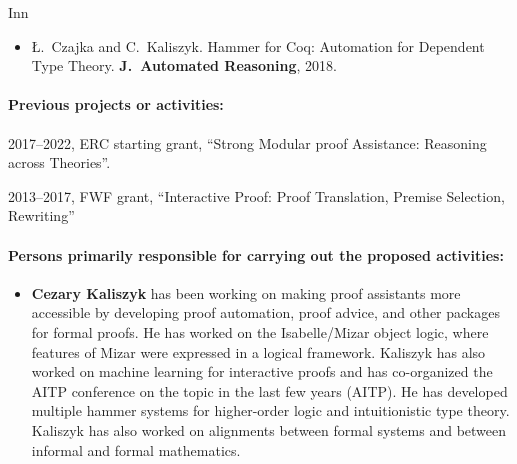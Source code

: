 \begin{sitedescription}{Inn}
\begin{itemize}
\item
Ł.~Czajka and C.~Kaliszyk.
\newblock Hammer for Coq: Automation for Dependent Type Theory.
\textbf{J.~Automated Reasoning}, 2018.
\end{itemize}

\paragraph{Previous projects or activities:}

\begin{compactitem}
\item 2017--2022, ERC starting grant, ``Strong Modular proof Assistance: Reasoning across Theories''.
\item 2013--2017, FWF grant, ``Interactive Proof: Proof Translation, Premise Selection, Rewriting''
\end{compactitem}




\paragraph{Persons primarily responsible for carrying out the proposed activities:}

\begin{itemize}
\item \textbf{Cezary Kaliszyk} has been working on making proof assistants
more accessible by developing proof automation, proof advice, and other packages for formal
proofs. He has worked on the Isabelle/Mizar object logic, where features of Mizar were
expressed in a logical framework. Kaliszyk has also worked on machine learning for interactive
proofs and has co-organized the AITP conference on the topic in the last few years (AITP). He
has developed multiple hammer systems for higher-order logic and intuitionistic type theory.
Kaliszyk has also worked on alignments between formal systems and between informal and formal
mathematics.
\end{itemize}



\end{sitedescription}

